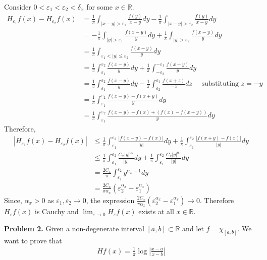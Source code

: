 \documentclass{article}
\newcommand{\R}{\mathbb{R}}
\begin{document}
Consider $0 < \varepsilon_1 < \varepsilon_2 < \delta_x$ for some $x\in \R$.
\begin{align*}
    H_{\varepsilon_1}f(x) - H_{\varepsilon_2}f(x) &= \frac{1}{\pi} \int_{|x-y| > \varepsilon_1} \frac{f(y)}{x-y}dy - \frac{1}{\pi} \int_{|x-y| > \varepsilon_2} \frac{f(y)}{x-y}dy \\
    &= - \frac{1}{\pi} \int_{|y| > \varepsilon_1} \frac{f(x-y)}{y}dy + \frac{1}{\pi} \int_{|y| > \varepsilon_2} \frac{f(x-y)}{y}dy \\
    &= \frac{1}{\pi} \int_{\varepsilon_1 < |y| \leq \varepsilon_2} \frac{f(x-y)}{y}dy\\
    &= \frac{1}{\pi} \int_{\varepsilon_1}^{\varepsilon_2} \frac{f(x-y)}{y}dy + \frac{1}{\pi} \int_{-\varepsilon_2}^{-\varepsilon_1} \frac{f(x-y)}{y}dy \\
    &= \frac{1}{\pi} \int_{\varepsilon_1}^{\varepsilon_2} \frac{f(x-y)}{y}dy - \frac{1}{\pi} \int_{\varepsilon_2}^{\varepsilon_1} \frac{f(x+z)}{-z}dz \quad \text{ substituting } z=-y\\
    &= \frac{1}{\pi} \int_{\varepsilon_1}^{\varepsilon_2} \frac{f(x-y) - f(x+y)}{y}dy\\
    &= \frac{1}{\pi} \int_{\varepsilon_1}^{\varepsilon_2} \frac{f(x-y) - f(x) + (f(x) - f(x+y))}{y}dy
\end{align*}
Therefore,
\begin{align*}
    |H_{\varepsilon_1}f(x) - H_{\varepsilon_2}f(x)| &\leq \frac{1}{\pi} \int_{\varepsilon_1}^{\varepsilon_2} \frac{|f(x-y) - f(x)|}{|y|}dy + \frac{1}{\pi} \int_{\varepsilon_1}^{\varepsilon_2} \frac{|f(x+y) - f(x)|}{|y|}dy\\
    &\leq \frac{1}{\pi} \int_{\varepsilon_1}^{\varepsilon_2} \frac{C_x|y|^{\alpha_x}}{|y|}dy + \frac{1}{\pi} \int_{\varepsilon_1}^{\varepsilon_2} \frac{C_x|y|^{\alpha_x}}{|y|}dy \\
    &= \frac{2C_x}{\pi} \int_{\varepsilon_1}^{\varepsilon_2} y^{\alpha_x - 1}dy\\
    &= \frac{2C_x}{\pi \alpha_x} (\varepsilon_2^{\alpha_x} - \varepsilon_1^{\alpha_x}) 
\end{align*}
Since, $\alpha_x>0$ as $\varepsilon_1,\varepsilon_2 \to 0$, the expression $\frac{2C_x}{\pi \alpha_x} (\varepsilon_2^{\alpha_x} - \varepsilon_1^{\alpha_x}) \to 0$. Therefore $H_{\varepsilon}f(x)$ is Cauchy and $\lim_{\varepsilon \to 0} H_{\varepsilon}f(x)$ exists at all $x \in \R$.

\clearpage

\textbf{Problem 2. } Given a non-degenerate interval $[a,b] \subset \R$ and let $f = \chi_{[a,b]}$. We want to prove that
\begin{gather*}
    Hf(x) = \frac{1}{\pi} \log \left| \frac{x-a}{x-b} \right|
\end{gather*}
\end{document}
